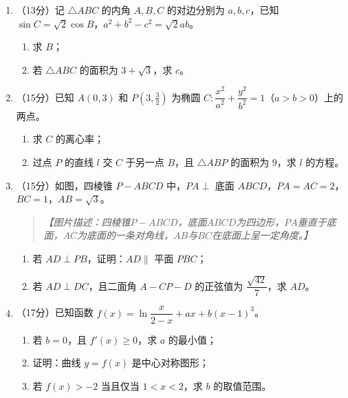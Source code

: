 \documentclass[12pt,a4paper]{article}
\begin{document}
\begin{enumerate}[label=\arabic*.]
\item （13分）记 $\triangle ABC$ 的内角 $A,B,C$ 的对边分别为 $a,b,c$，已知 $\sin C=\sqrt{2}\cos B$，$a^2+b^2-c^2=\sqrt{2}ab$。
\begin{enumerate}[label=(\arabic*)]
\item 求 $B$；
\item 若 $\triangle ABC$ 的面积为 $3+\sqrt{3}$，求 $c$。
\end{enumerate}

\vspace{0.3cm}

\item （15分）已知 $A(0,3)$ 和 $P(3,\frac{3}{2})$ 为椭圆 $C:\dfrac{x^2}{a^2}+\dfrac{y^2}{b^2}=1$（$a>b>0$）上的两点。
\begin{enumerate}[label=(\arabic*)]
\item 求 $C$ 的离心率；
\item 过点 $P$ 的直线 $l$ 交 $C$ 于另一点 $B$，且 $\triangle ABP$ 的面积为 $9$，求 $l$ 的方程。
\end{enumerate}

\vspace{0.3cm}

\item （15分）如图，四棱锥 $P-ABCD$ 中，$PA\perp$ 底面 $ABCD$，$PA=AC=2$，$BC=1$，$AB=\sqrt{3}$。
\begin{quote}
\emph{【图片描述：四棱锥$P-ABCD$，底面$ABCD$为四边形，$PA$垂直于底面，$AC$为底面的一条对角线，$AB$与$BC$在底面上呈一定角度。】}
\end{quote}
\begin{enumerate}[label=(\arabic*)]
\item 若 $AD\perp PB$，证明：$AD\parallel$ 平面 $PBC$；
\item 若 $AD\perp DC$，且二面角 $A-CP-D$ 的正弦值为 $\dfrac{\sqrt{42}}{7}$，求 $AD$。
\end{enumerate}

\vspace{0.3cm}

\item （17分）已知函数 $f(x)=\ln\dfrac{x}{2-x}+ax+b(x-1)^3$。
\begin{enumerate}[label=(\arabic*)]
\item 若 $b=0$，且 $f'(x)\geqslant 0$，求 $a$ 的最小值；
\item 证明：曲线 $y=f(x)$ 是中心对称图形；
\item 若 $f(x)>-2$ 当且仅当 $1<x<2$，求 $b$ 的取值范围。
\end{enumerate}


\end{enumerate}
\end{document}
